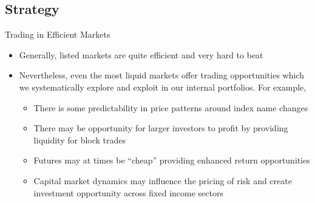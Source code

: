 \documentclass[10pt,english]{beamer}\usepackage[]{graphicx}\usepackage[]{color}
\begin{document}
\subsection{Strategy}
\begin{frame}{Trading in Efficient Markets}
 
\begin{itemize}
\item Generally, listed markets are quite efficient and very hard to beat
\item Nevertheless, even the most liquid markets offer trading opportunities
which we systematically explore and exploit in our internal portfolios.
For example, 
\begin{itemize}
\item There is some predictability in price patterns around index name changes
\item There may be opportunity for larger investors to profit by providing
liquidity for block trades
\item Futures may at times be ``cheap'' providing enhanced return opportunities
\item Capital market dynamics may influence the pricing of risk and create
investment opportunity across fixed income sectors
\end{itemize}
\end{itemize}
\end{frame}
%
\end{document}
